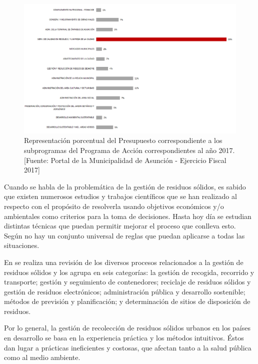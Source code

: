 \begin{figure}[H]
    \centering
    \includegraphics[width=15cm]{20181119_PresupuestoAccion2017.png}
    \caption{ Representación porcentual del Presupuesto correspondiente a los subprogramas del Programa de Acción correspondientes al año 2017. [Fuente: Portal de la Municipalidad de Asunción - Ejercicio Fiscal 2017]}
    \label{fig:programaAccion}
\end{figure}

Cuando se habla de la problemática de la gestión de residuos sólidos, es sabido que existen numerosos estudios y trabajos científicos que se han realizado al respecto con el propósito de resolverla usando objetivos económicos y/o ambientales como criterios para la toma de decisiones. Hasta hoy día se estudian distintas técnicas que puedan permitir mejorar el proceso que conlleva esto. Según \citet{Tchobanoglous1993IntegratedIssues} no hay un conjunto universal de reglas que puedan aplicarse a todas las situaciones.

En \citet{VitorinodeSouzaMelare2017TechnologiesReview} se realiza una revisión de los diversos procesos relacionados a la gestión de residuos sólidos y los agrupa en seis categorías: la gestión de recogida, recorrido y transporte; gestión y seguimiento de contenedores; reciclaje de residuos sólidos y gestión de residuos electrónicos; administración pública y desarrollo sostenible; métodos de previsión y planificación; y determinación de sitios de disposición de residuos.

Por lo general, la gestión de recolección de residuos sólidos urbanos en los países en desarrollo se basa en la experiencia práctica y los métodos intuitivos. Éstos dan lugar a prácticas ineficientes y costosas, que afectan tanto a la salud pública como al medio ambiente.

